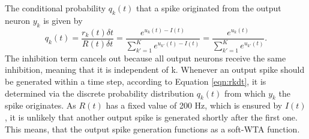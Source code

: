 The conditional probability $q_k(t)$ that a spike originated from the output neuron $y_k$ is given by
\begin{equation}
\label{eqn:qk}
q_k(t) = \frac{r_k(t) \delta t}{R(t) \delta t} = \frac{e^{u_k(t) - I(t)}}{\sum_{k'=1}^K e^{u_{k'}(t) - I(t)}} = \frac{e^{u_k(t)}}{\sum_{k'=1}^K e^{u_{k'}(t)}}.
\end{equation}
The inhibition term cancels out because all output neurons receive the same inhibition, meaning that it is independent of k. Whenever an output spike should be generated within a time step, according to Equation \ref{eqn:rkdt}, it is determined via the discrete probability distribution $q_k(t)$ from which $y_k$ the spike originates. As $R(t)$ has a fixed value of 200 Hz, which is ensured by $I(t)$, it is unlikely that another output spike is generated shortly after the first one. This means, that the output spike generation functions as a soft-WTA function.
 
